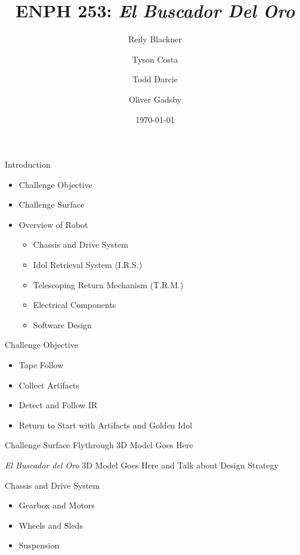 \documentclass[aspectratio=1610]{beamer}
\title{ENPH 253: \textit{El Buscador Del Oro}}
\date{\today}
\author{Reily Blackner \and Tyson Costa \\ \and Todd Darcie \and Oliver Gadsby}
\institute{University of British Columbia}
\begin{document}
\begin{frame}
  \titlepage
\end{frame}

\begin{frame}{Introduction}
  \begin{itemize}
    \item Challenge Objective
    \item Challenge Surface
    \item Overview of Robot
      \begin{itemize}
        \item Chassis and Drive System
        \item Idol Retrieval System (I.R.S.)
        \item Telescoping Return Mechanism (T.R.M.)
        \item Electrical Components
        \item Software Design
      \end{itemize}
  \end{itemize}
\end{frame}

\begin{frame}{Challenge Objective}
  \begin{itemize}
    \item Tape Follow
    \item Collect Artifacts
    \item Detect and Follow IR
    \item Return to Start with Artifacts and Golden Idol
  \end{itemize}
\end{frame}

\begin{frame}{Challenge Surface Flythrough}
3D Model Goes Here
\end{frame}

\begin{frame}{\textit{El Buscador del Oro}}
3D Model Goes Here and Talk about Design Strategy
\end{frame}

\begin{frame}{Chassis and Drive System}
  \begin{itemize}
    \item Gearbox and Motors
    \item Wheels and Sleds
    \item Suspension
  \end{itemize}
\end{frame}
\end{document}
